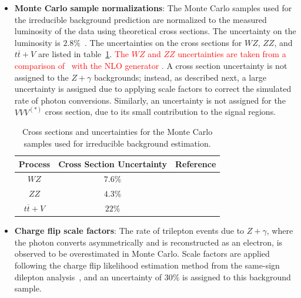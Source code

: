 \begin{itemize}
	\item \textbf{Monte Carlo sample normalizations}: The Monte Carlo samples used for the irreducible background prediction are normalized to the measured luminosity of the data using theoretical cross sections. The uncertainty on the luminosity is $2.8\%$~\cite{luminosity}. The uncertainties on the cross sections for $WZ$, $ZZ$, and $t\overline{t}+V$ are listed in table~\ref{table:mc-cross-section-uncertainties}. \textcolor{red}{The $WZ$ and $ZZ$ uncertainties are taken from a comparison of \sherpa\ with the NLO generator \vbfnlo.} A cross section uncertainty is not assigned to the $Z+\gamma$ backgrounds; instead, as described next, a large uncertainty is assigned due to applying scale factors to correct the simulated rate of photon conversions. Similarly, an uncertainty is not assigned for the $VVV^{(*)}$ cross section, due to its small contribution to the signal regions. 


	\begin{table}[h]
		\centering
		\begin{tabular}{ccc}
			Process & Cross Section Uncertainty & Reference \\
			\hline
			$WZ$ & $7.6\%$ & \cite{DeViveiros:1670929}\\
			$ZZ$ & $4.3\%$ & \cite{DeViveiros:1670929} \\
			$t\overline{t}+V$ & $22\%$ & \cite{ttV} \\
		\end{tabular}	
		\caption{Cross sections and uncertainties for the Monte Carlo samples used for irreducible background estimation.}
		\label{table:mc-cross-section-uncertainties}
	\end{table}

	\item \textbf{Charge flip scale factors}: The rate of trilepton events due to $Z+\gamma$, where the photon converts asymmetrically and is reconstructed as an electron, is observed to be overestimated in Monte Carlo. Scale factors are applied following the charge flip likelihood estimation method from the same-sign dilepton analysis~\cite{DeViveiros:1670929}, and an uncertainty of $30\%$ is assigned to this background sample.


\end{itemize}
